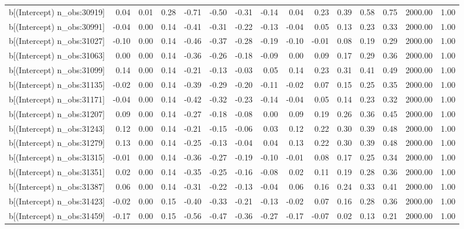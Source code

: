 \begin{table}[ht]
\begin{tabular}{rrrrrrrrrrrrrrr}
  b[(Intercept) n\_obs:30919] & 0.04 & 0.01 & 0.28 & -0.71 & -0.50 & -0.31 & -0.14 & 0.04 & 0.23 & 0.39 & 0.58 & 0.75 & 2000.00 & 1.00 \\ 
  b[(Intercept) n\_obs:30991] & -0.04 & 0.00 & 0.14 & -0.41 & -0.31 & -0.22 & -0.13 & -0.04 & 0.05 & 0.13 & 0.23 & 0.33 & 2000.00 & 1.00 \\ 
  b[(Intercept) n\_obs:31027] & -0.10 & 0.00 & 0.14 & -0.46 & -0.37 & -0.28 & -0.19 & -0.10 & -0.01 & 0.08 & 0.19 & 0.29 & 2000.00 & 1.00 \\ 
  b[(Intercept) n\_obs:31063] & 0.00 & 0.00 & 0.14 & -0.36 & -0.26 & -0.18 & -0.09 & 0.00 & 0.09 & 0.17 & 0.29 & 0.36 & 2000.00 & 1.00 \\ 
  b[(Intercept) n\_obs:31099] & 0.14 & 0.00 & 0.14 & -0.21 & -0.13 & -0.03 & 0.05 & 0.14 & 0.23 & 0.31 & 0.41 & 0.49 & 2000.00 & 1.00 \\ 
  b[(Intercept) n\_obs:31135] & -0.02 & 0.00 & 0.14 & -0.39 & -0.29 & -0.20 & -0.11 & -0.02 & 0.07 & 0.15 & 0.25 & 0.35 & 2000.00 & 1.00 \\ 
  b[(Intercept) n\_obs:31171] & -0.04 & 0.00 & 0.14 & -0.42 & -0.32 & -0.23 & -0.14 & -0.04 & 0.05 & 0.14 & 0.23 & 0.32 & 2000.00 & 1.00 \\ 
  b[(Intercept) n\_obs:31207] & 0.09 & 0.00 & 0.14 & -0.27 & -0.18 & -0.08 & 0.00 & 0.09 & 0.19 & 0.26 & 0.36 & 0.45 & 2000.00 & 1.00 \\ 
  b[(Intercept) n\_obs:31243] & 0.12 & 0.00 & 0.14 & -0.21 & -0.15 & -0.06 & 0.03 & 0.12 & 0.22 & 0.30 & 0.39 & 0.48 & 2000.00 & 1.00 \\ 
  b[(Intercept) n\_obs:31279] & 0.13 & 0.00 & 0.14 & -0.25 & -0.13 & -0.04 & 0.04 & 0.13 & 0.22 & 0.30 & 0.39 & 0.48 & 2000.00 & 1.00 \\ 
  b[(Intercept) n\_obs:31315] & -0.01 & 0.00 & 0.14 & -0.36 & -0.27 & -0.19 & -0.10 & -0.01 & 0.08 & 0.17 & 0.25 & 0.34 & 2000.00 & 1.00 \\ 
  b[(Intercept) n\_obs:31351] & 0.02 & 0.00 & 0.14 & -0.35 & -0.25 & -0.16 & -0.08 & 0.02 & 0.11 & 0.19 & 0.28 & 0.36 & 2000.00 & 1.00 \\ 
  b[(Intercept) n\_obs:31387] & 0.06 & 0.00 & 0.14 & -0.31 & -0.22 & -0.13 & -0.04 & 0.06 & 0.16 & 0.24 & 0.33 & 0.41 & 2000.00 & 1.00 \\ 
  b[(Intercept) n\_obs:31423] & -0.02 & 0.00 & 0.15 & -0.40 & -0.33 & -0.21 & -0.13 & -0.02 & 0.07 & 0.16 & 0.28 & 0.36 & 2000.00 & 1.00 \\ 
  b[(Intercept) n\_obs:31459] & -0.17 & 0.00 & 0.15 & -0.56 & -0.47 & -0.36 & -0.27 & -0.17 & -0.07 & 0.02 & 0.13 & 0.21 & 2000.00 & 1.00 \\ 

\end{tabular}
\end{table}
